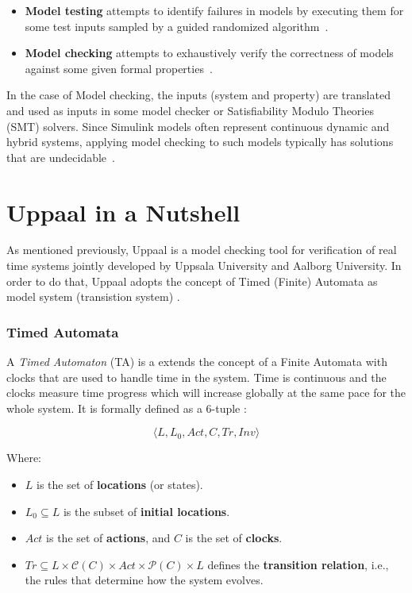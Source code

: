 \begin{itemize}
    \item \textbf{Model testing} attempts to identify failures in models by executing them for some test inputs sampled by a guided randomized algorithm~\cite{Haque2022}.

    \item \textbf{Model checking} attempts to exhaustively verify the correctness of models against some given formal properties~\cite{Haque2022}.
\end{itemize}

In the case of Model checking, the inputs (system and property) are translated and used as inputs in some model checker or Satisfiability Modulo Theories (SMT) solvers. Since Simulink models often represent continuous dynamic and hybrid systems, applying model checking to such models typically has solutions that are undecidable~\cite{Chakraborty2011}.


\section{Uppaal in a Nutshell}

As mentioned previously, Uppaal is a model checking tool for verification of real time systems jointly developed by Uppsala University and Aalborg University. In order to do that, Uppaal adopts the concept of Timed (Finite) Automata as model system (transistion system) \cite{Behrmann2006}. 

\subsubsection{Timed Automata}

A \textit{Timed Automaton} (TA) is a extends the concept of a Finite Automata with clocks that are used to handle time in the system. Time is continuous and the clocks measure time progress which will increase globally at the same pace for the whole system. It is formally defined as a 6-tuple \cite{baier2008principles}:



\[
\langle L, L_0, Act, C, Tr, Inv \rangle
\]

Where:
\begin{itemize}
    \item \( L \) is the set of \textbf{locations} (or states).
    \item \( L_0 \subseteq L \) is the subset of \textbf{initial locations}.
    \item \( Act \) is the set of \textbf{actions}, and \( C \) is the set of \textbf{clocks}.
    \item \( Tr \subseteq L \times \mathcal{C}(C) \times Act \times \mathcal{P}(C) \times L \) defines the \textbf{transition relation}, i.e., the rules that determine how the system evolves.
\end{itemize}

